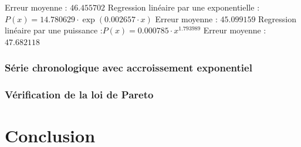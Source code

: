 \documentclass{report}
\begin{document}
	Erreur moyenne : $46.455702$
	\newline
	\newline
	Regression linéaire par une exponentielle :$P(x) = 14.780629 \cdot \exp(0.002657 \cdot x)$
	\newline
	Erreur moyenne : $45.099159$
	\newline
	\newline
	Regression linéaire par une puissance :$P(x) = 0.000785  \cdot x^{1.793989}$
	\newline
	Erreur moyenne : $47.682118$
      \newpage
      
      \subsection{Série chronologique avec accroissement exponentiel}
      
      \newpage
      
      \subsection{Vérification de la loi de Pareto}

  \chapter{Conclusion}
\end{document}
